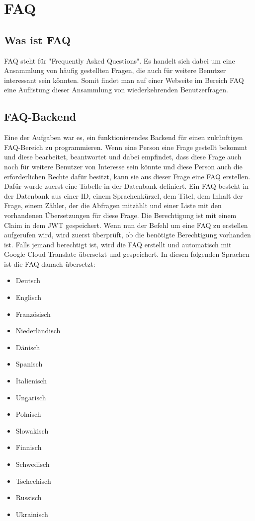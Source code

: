 \chapter{FAQ}
\section{Was ist FAQ}
FAQ steht für "Frequently Asked Questions". Es handelt sich dabei um eine Ansammlung von häufig gestellten Fragen, die auch für weitere Benutzer interessant sein könnten. Somit findet man auf einer Webseite im Bereich FAQ eine Auflistung dieser Ansammlung von wiederkehrenden Benutzerfragen.
\section{FAQ-Backend}
Eine der Aufgaben war es, ein funktionierendes Backend für einen zukünftigen FAQ-Bereich zu programmieren. Wenn eine Person eine Frage gestellt bekommt und diese bearbeitet, beantwortet und dabei empfindet, dass diese Frage auch noch für weitere Benutzer von Interesse sein könnte und diese Person auch die erforderlichen Rechte dafür besitzt, kann sie aus dieser Frage eine FAQ erstellen.\\
Dafür wurde zuerst eine Tabelle in der Datenbank definiert. Ein FAQ besteht in der Datenbank aus einer ID, einem Sprachenkürzel, dem Titel, dem Inhalt der Frage, einem Zähler, der die Abfragen mitzählt und einer Liste mit den vorhandenen Übersetzungen für diese Frage. Die Berechtigung ist mit einem Claim in dem JWT gespeichert. Wenn nun der Befehl um eine FAQ zu erstellen aufgerufen wird, wird zuerst überprüft, ob die benötigte Berechtigung vorhanden ist. Falls jemand berechtigt ist, wird die FAQ erstellt und automatisch mit Google Cloud Translate übersetzt und gespeichert. In diesen folgenden Sprachen ist die FAQ danach übersetzt:
\begin{multicols}{2}
	\begin{itemize}
		\item Deutsch
		\item Englisch
		\item Französisch
		\item Niederländisch
		\item Dänisch
		\item Spanisch
		\item Italienisch
		\item Ungarisch
		\item Polnisch
		\item Slowakisch
		\item Finnisch
		\item Schwedisch
		\item Tschechisch
		\item Russisch
		\item Ukrainisch
	\end{itemize}
\end{multicols}